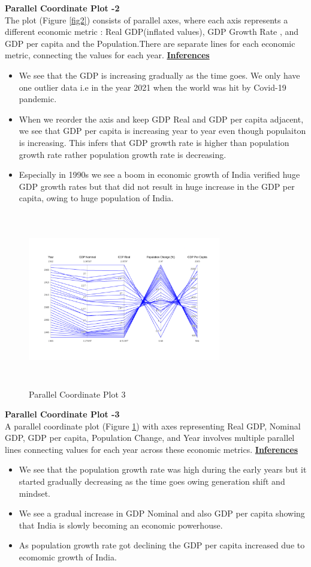\documentclass[conference]{IEEEtran}
\begin{document}
 \textbf{Parallel Coordinate Plot -2}\\
The plot (Figure \ref{fig2}) consists of parallel axes, where each axis represents a different economic metric : Real GDP(inflated values), GDP Growth Rate , and GDP per capita and the Population.There are separate lines for each economic metric, connecting the values for each year.
\underline{\textbf{Inferences}}
\begin{itemize}
    \item We see that the GDP is increasing gradually as the time goes. We only have one outlier data i.e in the year 2021 when the world was hit by Covid-19 pandemic.
    \item When we reorder the axis and keep GDP Real and GDP per capita adjacent, we see that GDP per capita is increasing year to year even though populaiton is increasing. This infers that GDP growth rate is higher than population growth rate rather population growth rate is decreasing.
    \item Especially in 1990s we see a boom in economic growth of India verified huge GDP growth rates but that did not result in huge increase in the GDP per capita, owing to huge population of India.
\end{itemize} 
\begin{figure}
\centering
    \includegraphics[height=3in, width=0.75\textwidth]{images_ashish/pcp_3.png}
    \caption{Parallel Coordinate Plot 3}
    \label{fig3}
\end{figure}
\textbf{Parallel Coordinate Plot -3}\\
 A parallel coordinate plot (Figure \ref{fig3})  with axes representing Real GDP, Nominal GDP, GDP per capita, Population Change, and Year involves multiple parallel lines connecting values for each year across these economic metrics.
\underline{\textbf{Inferences}}
\begin{itemize}
    \item We see that the population growth rate was high during the early years but it started gradually decreasing as the time goes owing generation shift and mindset.
    \item We see a gradual increase in GDP Nominal and also GDP per capita showing that India is slowly becoming an economic powerhouse.
    \item As population growth rate got declining the GDP per capita increased due to ecomomic growth of India.
\end{itemize}
\end{document}
